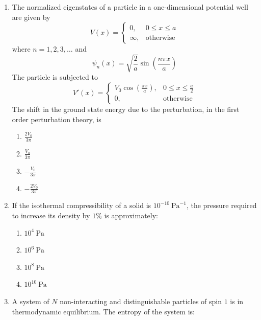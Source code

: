 \documentclass[journal,12pt,onecolumn]{IEEEtran}
\begin{document}
\begin{enumerate}
\item The normalized eigenstates of a particle in a one-dimensional potential well are given by  
\[
V(x) = 
\begin{cases}
0, & 0 \le x \le a \\
\infty, & \text{otherwise}
\end{cases}
\]
where $n = 1,2,3,\dots$ and  
\[
\psi_{n}(x) = \sqrt{\frac{2}{a}} \sin\left( \frac{n\pi x}{a} \right)
\]
The particle is subjected to  
\[
V'(x) = 
\begin{cases}
V_{0} \cos\left( \frac{\pi x}{a} \right), & 0 \le x \le \frac{a}{2} \\
0, & \text{otherwise}
\end{cases}
\]
The shift in the ground state energy due to the perturbation, in the first order perturbation theory, is  

\hfill{}

\begin{multicols}{4}
\begin{enumerate}
    \item $\frac{2V_{0}}{3\pi}$
    \item $\frac{V_{0}}{3\pi}$
    \item $-\frac{V_{0}}{3\pi}$
    \item $-\frac{2V_{0}}{3\pi}$
\end{enumerate}
\end{multicols}

\item If the isothermal compressibility of a solid is $10^{-10} \ \mathrm{Pa}^{-1}$, the pressure required to increase its density by $1\%$ is approximately:

\hfill{}

\begin{multicols}{4}
\begin{enumerate}
    \item $10^{4} \ \mathrm{Pa}$
    \item $10^{6} \ \mathrm{Pa}$
    \item $10^{8} \ \mathrm{Pa}$
    \item $10^{10} \ \mathrm{Pa}$
\end{enumerate}
\end{multicols}

\item A system of $N$ non-interacting and distinguishable particles of spin $1$ is in thermodynamic equilibrium. The entropy of the system is:


\end{enumerate}
\end{document}

